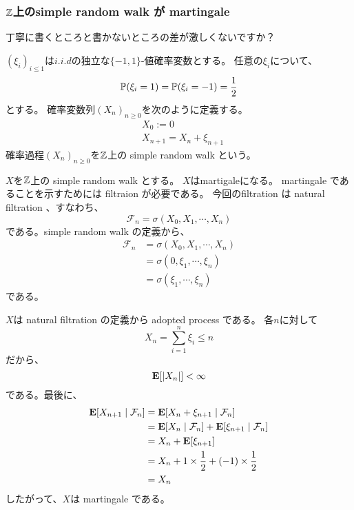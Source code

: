       \subsubsection{${\mathbb{Z}}$上のsimple random walk が martingale}
        丁寧に書くところと書かないところの差が激しくないですか？

        \begin{def*}
          $(\xi_i)_{i \leq 1}$は$i.i.d$の独立な$\{-1, 1\}$-値確率変数とする。
          任意の$\xi_i$について、
          \[
            {\mathbb{P}}(\xi_i = 1) = {\mathbb{P}}(\xi_i = -1) = \frac{1}{2}
          \]
          とする。
          確率変数列$(X_n)_{n \ge 0}$を次のように定義する。
          \begin{align*}
            &X_0 := 0 \\
            &X_{n+1} = X_n + \xi_{n+1}
          \end{align*}
          確率過程$(X_n)_{n \ge 0}$を${\mathbb{Z}}$上の simple random walk という。
        \end{def*}

        $X$を${\mathbb{Z}}$上の simple random walk とする。
        $X$はmartigaleになる。
        martingale であることを示すためには filtraion が必要である。
        今回のfiltration は natural filtration 、すなわち、
        \[
          \mathcal{F}_n = \sigma(X_0,X_1, \cdots , X_n)
        \]
        である。simple random walk の定義から、
        \begin{align*}
          \mathcal{F}_n &= \sigma(X_0,X_1, \cdots , X_n)\\
          &= \sigma(0, \xi_1, \cdots ,\xi_n) \\
          &= \sigma(\xi_1, \cdots ,\xi_n)
        \end{align*}
        である。

        $X$は natural filtration の定義から adopted process である。
        各$n$に対して
        \[
          X_n = \sum_{i = 1}^{n} \xi_i \leq n
        \]
        だから、
        \[
          {\mathbf{E}}[|X_n|] < \infty
        \]
        である。最後に、
        \begin{align*}
          {\mathbf{E}}[X_{n+1} \mid \mathcal{F}_n] &= {\mathbf{E}}[X_{n} + \xi_{n + 1} \mid \mathcal{F}_n]\\
          &= {\mathbf{E}}[X_{n} \mid \mathcal{F}_n] + {\mathbf{E}}[\xi_{n + 1} \mid \mathcal{F}_n] \\
          &= X_{n} + {\mathbf{E}}[\xi_{n + 1}] \\
          &= X_{n} + 1 \times \frac{1}{2} + (-1) \times \frac{1}{2}\\
          &= X_{n}
        \end{align*}
        したがって、$X$は martingale である。

